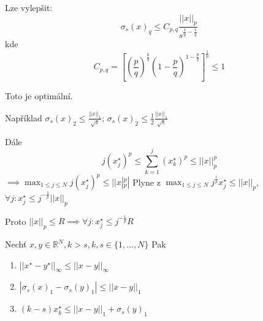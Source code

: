 \documentclass[../main.tex]{subfiles}
\begin{document}
\begin{remark}
    Lze vylepšit: 
    \begin{equation}
        \sigma_s(x)_q \leq C_{p,q}\frac{||x||_p}{s^{\frac{1}{p} - \frac{1}{q}}}
    \end{equation}
    kde 
    \begin{equation}
        C_{p,q} = \left[\left(\frac{p}{q}\right)^\frac{p}{q} \left(1 - \frac{p}{q}\right)^{1 - \frac{p}{q}} \right]^{\frac{1}{p}} \leq 1 
    \end{equation}

    Toto je optimální. 

    Například $\sigma_s(x)_2 \leq \frac{||x||_1}{\sqrt{s}}$; $\sigma_s(x)_2 \leq \frac{1}{2} \frac{||x||_1}{\sqrt{s}}$


    Dále 
    \begin{equation}
        j (x_j^\star)^p \leq \sum_{k=1}^{j} (x_k^\star)^p \leq ||x||_p^p 
    \end{equation}
    $\implies \max_{1\leq j\leq N} j (x_j^\star)^p \leq ||x|_p^p|$
    Plyne z $\max_{1\leq j \leq N} j^{\frac{1}{p}} x_j^\star \leq ||x||_p$, $\forall j: x_j^\star \leq j^{-\frac{1}{p}} ||x||_p$

    
    Proto 
    $||x||_p \leq R \implies \forall j: x_j^\star \leq j^{-\frac{1}{p}} R$
\end{remark}



\begin{lemma}
    Nechť $x,y \in \mathbb{R}^N, k>s, k,s\in \{1,\dots, N \}$ Pak 
    \begin{enumerate}
        \item $||x^\star - y^\star ||_\infty \leq ||x-y||_\infty$
        \item $\left|\sigma_s(x)_1 - \sigma_s(y)_1\right| \leq ||x-y||_1 $
        \item $(k-s) x_k^\star \leq ||x-y||_1 + \sigma_s(y)_1 $
    \end{enumerate}
\end{lemma}
\end{document}
